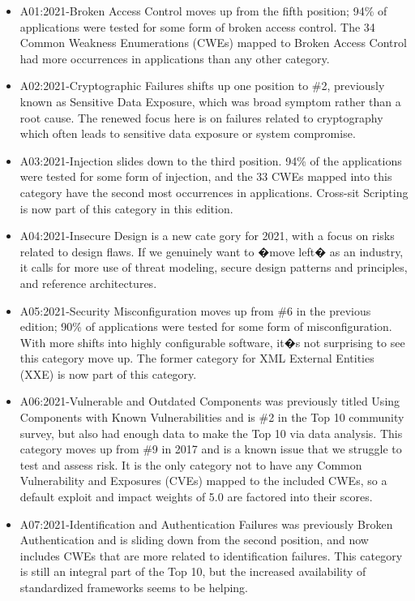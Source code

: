 \begin{itemize}
\item A01:2021-Broken Access Control moves up from the fifth position; 94\% of applications were tested for some form of broken access control. The 34 Common Weakness Enumerations (CWEs) mapped to Broken Access Control had more occurrences in applications than any other category.

\item A02:2021-Cryptographic Failures shifts up one position to \#2, previously known as Sensitive Data Exposure,
which was broad symptom rather than a root cause. The renewed focus here is on failures related to
cryptography which often leads to sensitive data exposure or system compromise.

\item A03:2021-Injection slides down to the third position. 94\% of the applications were tested for some form of injection, and the 33 CWEs mapped into this category have the second most occurrences in applications. Cross-sit Scripting is now part of this category in this edition.

\item A04:2021-Insecure Design is a new cate
gory for 2021, with a focus on risks related to design flaws. If we genuinely want to �move left� as an industry, it calls for more use of threat modeling,
secure design patterns and principles, and reference architectures.

\item A05:2021-Security Misconfiguration moves up from \#6 in the previous edition; 90\% of applications were tested for some form of misconfiguration. With more shifts into highly configurable software, it�s not surprising to see this category move up. The former category for XML External Entities (XXE) is now part of this category.

\item A06:2021-Vulnerable and Outdated Components was previously titled Using Components with Known Vulnerabilities and is \#2 in the Top 10 community survey, but also had enough data to make the Top 10 via data analysis. This category moves up from \#9 in 2017 and is a known issue that we struggle to test and assess risk. It is the only category not to have any Common Vulnerability and Exposures (CVEs) mapped to the included CWEs, so a default exploit and impact weights of 5.0 are factored into their scores.

\item A07:2021-Identification and Authentication Failures was previously Broken Authentication and is sliding down from the second position, and now includes CWEs that are more related to identification failures. This category is still an integral part of the Top 10, but the increased availability of standardized frameworks seems to be helping.


\end{itemize}
